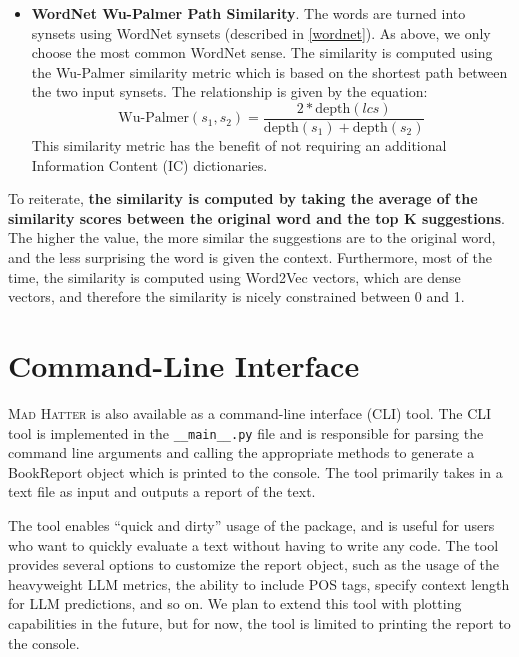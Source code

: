 \begin{description}
\begin{itemize}
            \item \textbf{WordNet Wu-Palmer Path Similarity}. The words are turned into synsets using WordNet synsets (described in \ref{wordnet}). As above, we only choose the most common WordNet sense. The similarity is computed using the Wu-Palmer similarity metric which is based on the shortest path between the two input synsets. The relationship is given by the equation:
            \begin{equation}
                \text{Wu-Palmer}(s_1, s_2) = \frac{2 * \text{depth}(lcs)}{\text{depth}(s_1) + \text{depth}(s_2)}
            \end{equation}
            This similarity metric has the benefit of not requiring an additional Information Content (IC) dictionaries.
        \end{itemize}

        To reiterate, \textbf{the similarity is computed by taking the average of the similarity scores between the original word and the top K suggestions}. The higher the value, the more similar the suggestions are to the original word, and the less surprising the word is given the context. Furthermore, most of the time, the similarity is computed using Word2Vec vectors, which are dense vectors, and therefore the similarity is nicely constrained  between 0 and 1.

        
\end{description} 

\section{Command-Line Interface}

\textsc{Mad Hatter} is also available as a command-line interface (CLI) tool. The CLI tool is implemented in the \texttt{\_\_main\_\_.py} file and is responsible for parsing the command line arguments and calling the appropriate methods to generate a BookReport object which is printed to the console. The tool primarily takes in a text file as input and outputs a report of the text. 

The tool enables ``quick and dirty'' usage of the package, and is useful for users who want to quickly evaluate a text without having to write any code. The tool provides several options to customize the report object, such as the usage of the heavyweight LLM metrics, the ability to include POS tags, specify context length for LLM predictions, and so on. We plan to extend this tool with plotting capabilities in the future, but for now, the tool is limited to printing the report to the console.


